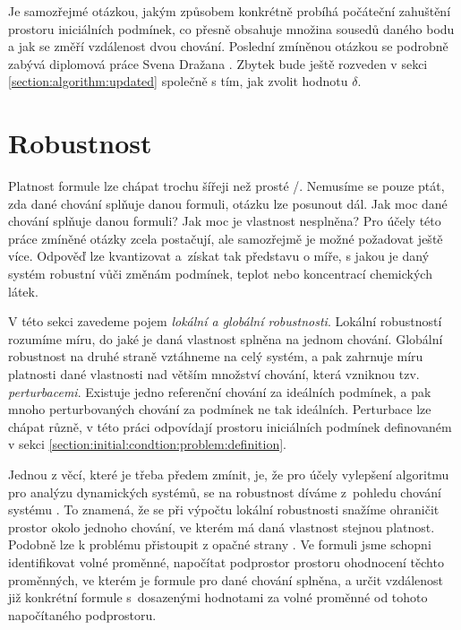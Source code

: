 Je samozřejmé otázkou, jakým způsobem konkrétně probíhá počáteční zahuštění prostoru
iniciálních podmínek, co přesně obsahuje mno\-žina sousedů daného bodu a jak
se změří vzdálenost dvou chování. Poslední zmí\-ně\-nou otázkou se podrobně zabývá diplomová práce Svena Dražana \cite{drazan2011}.
Zbytek bude ještě rozveden v sekci \ref{section:algorithm:updated} společně s tím,
jak zvolit hodnotu $\delta$.

\section{Robustnost}\label{section:robustness}

Platnost formule lze chápat trochu šířeji než prosté /.
Nemusíme se pouze ptát, zda dané chování splňuje danou formuli, otázku lze posunout dál.
Jak moc dané chování splňuje danou formuli? Jak moc je vlastnost nesplněna? Pro účely
této práce zmíněné otázky zcela postačují, ale samozřejmě je možné požadovat ještě více.
Odpověď lze kvantizovat a~zís\-kat tak představu o míře, s  jakou je daný systém robustní
vůči změnám podmínek, teplot nebo koncentrací chemických látek.

V této sekci zavedeme pojem \textit{lokální a globální robustnosti}. Lokální robustností
rozumíme míru, do jaké je daná vlastnost splněna na jednom chování. Globální robustnost
na druhé straně vztáhneme na celý systém, a pak zahrnuje míru platnosti dané vlastnosti
nad větším množství chování, která vzniknou tzv. \textit{perturbacemi}. Existuje jedno
referenční chování za ideálních podmínek, a pak mnoho perturbovaných chování za podmínek
ne tak i\-deál\-ních. Perturbace lze chápat různě, v této práci odpovídají prostoru i\-ni\-ciál\-ních
podmínek definovaném v sekci \ref{section:initial:condtion:problem:definition}. 

Jednou z věcí, které je třeba předem zmínit, je, že pro účely vylepšení algoritmu pro
analýzu dynamických systémů, se na robustnost díváme z~pohledu chování systému \cite{donze2011}.
To znamená, že se při výpočtu lokální robustnosti snažíme ohraničit prostor okolo jednoho chování,
ve kterém má daná vlastnost stejnou platnost. Podobně lze k problému přistoupit z opačné strany \cite{rizk2009}.
Ve formuli jsme schopni identifikovat volné proměnné, na\-po\-čí\-tat podprostor prostoru ohodnocení těchto proměnných, ve kterém je formule
pro dané chování splněna, a určit vzdálenost již konkrétní formule s~do\-sa\-ze\-ný\-mi hodnotami za volné proměnné
od tohoto napočítaného podprostoru.

